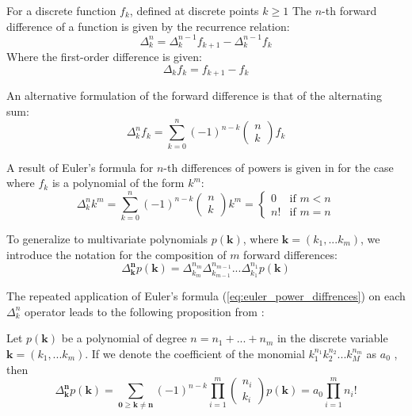 \begin{definition}
    For a discrete function \(f_k\), defined at discrete points \(k \geq 1\) The \(n\)-th forward difference of a function is given by the recurrence relation:
    \[\Delta_k^n = \Delta_k^{n-1} f_{k+1} - \Delta_k^{n-1} f_{k}\]
    Where the first-order difference is given:
    \[\Delta_k f_k = f_{k+1} - f_k\]
\end{definition}

An alternative formulation of the forward difference is that of the alternating sum:
\begin{equation}
    \Delta_k^n f_k = \sum_{k=0}^n (-1)^{n-k} \begin{pmatrix} n \\ k\end{pmatrix} f_k
\end{equation}

A result of Euler's formula for \(n\)-th differences of powers is given in \cite{Gould1978EulersPowers} for the case where \(f_k\) is a polynomial of the form \(k^m\):
\begin{equation}\label{eq:euler_power_diffrences}
    \Delta_k^n k^m = \sum_{k=0}^n (-1)^{n-k} \begin{pmatrix} n \\ k\end{pmatrix} k^m = 
    \begin{cases}
    0 & \text{if } m < n \\
    n! & \text{if } m=n
    \end{cases}
\end{equation}

To generalize to multivariate polynomials \(p(\mathbf{k})\), where \(\mathbf{k} = (k_1, ... k_m)\), we introduce the notation for the composition of \(m\) forward differences:
\begin{equation}
    \Delta_\mathbf{k}^\mathbf{n} p(\mathbf{k}) = \Delta_{k_m}^{n_m} \Delta_{k_{m-1}}^{n_{m-1}} ... \Delta_{k_1}^{n_1} p(\mathbf{k})
\end{equation}

The repeated application of Euler's formula (\ref{eq:euler_power_diffrences}) on each \(\Delta^n_k\) operator leads to the following proposition from \cite{Casale2018ExplicitRepresentations}:
\begin{theorem} \label{theorem:multivar_euler_power_differnces}
    Let \(p(\mathbf{k})\) be a polynomial of degree \(n = n_1 + ... + n_m\) in the discrete variable \(\mathbf{k} = (k_1, ... k_m)\). If we denote the coefficient of the monomial \(k_1^{n_1}k_2^{n_2}...k_M^{n_m}\) as \(a_0\) , then
    \begin{equation}
        \Delta_\mathbf{k}^\mathbf{n} p(\mathbf{k}) = \sum_{\mathbf{0 \geq k \neq n}} (-1)^{n-k} \prod_{i=1}^m \begin{pmatrix} n_i \\ k_i \end{pmatrix} p(\mathbf{k}) = a_0 \prod_{i=1}^m n_i!
    \end{equation}
\end{theorem}

